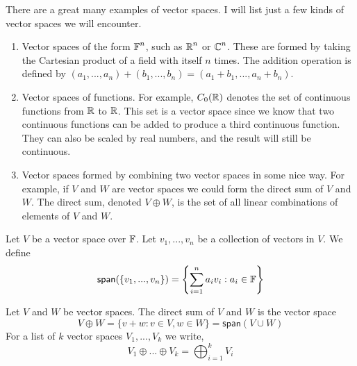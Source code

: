 \begin{example}
There are a great many examples of vector spaces. I will list just a few kinds of vector spaces we will encounter.

\begin{enumerate}
\item {
Vector spaces of the form $\operatorname{\mathbb{F}}^n$, such as $\operatorname{\mathbb{R}}^n$ or $\operatorname{\mathbb{C}}^n$. These are formed by taking the Cartesian product of a field with itself $n$ times. The addition operation is defined by $(a_1,...,a_n) + (b_1,...,b_n) = (a_1+b_1,...,a_n+b_n)$.
}
\item {
Vector spaces of functions. For example, $C_0(\operatorname{\mathbb{R}})$ denotes the set of continuous functions from $\operatorname{\mathbb{R}}$ to $\operatorname{\mathbb{R}}$. This set is a vector space since we know that two continuous functions can be added to produce a third continuous function. They can also be scaled by real numbers, and the result will still be continuous.
}
\item {
Vector spaces formed by combining two vector spaces in some nice way. For example, if $V$ and $W$ are vector spaces we could form the direct sum of $V$ and $W$. The direct sum, denoted $V \oplus W$, is the set of all linear combinations of elements of $V$ and $W$.
}
\end{enumerate}
\end{example}
\begin{defn}[Span]
Let $V$ be a vector space over $\operatorname{\mathbb{F}}$. Let $v_1,...,v_n$ be a collection of vectors in $V$. We define
\begin{equation}
    \operatorname{\textsf{span}}(\{v_1,...,v_n\}) = \left\{\sum_{i=1}^n a_i v_i : a_i \in \operatorname{\mathbb{F}}\right\}
\end{equation}
\end{defn}

\begin{defn} Let $V$ and $W$ be vector spaces. The direct sum of $V$ and $W$ is the vector space 
\begin{equation}V\oplus W = \{v+w: v \in V, w \in W\} = \textsf{span}(V\cup W)\end{equation}
For a list of $k$ vector spaces $V_1,...,V_k$ we write,
\begin{equation}
    V_1\oplus...\oplus V_k = \bigoplus_{i=1}^k V_i
\end{equation}
\end{defn}

